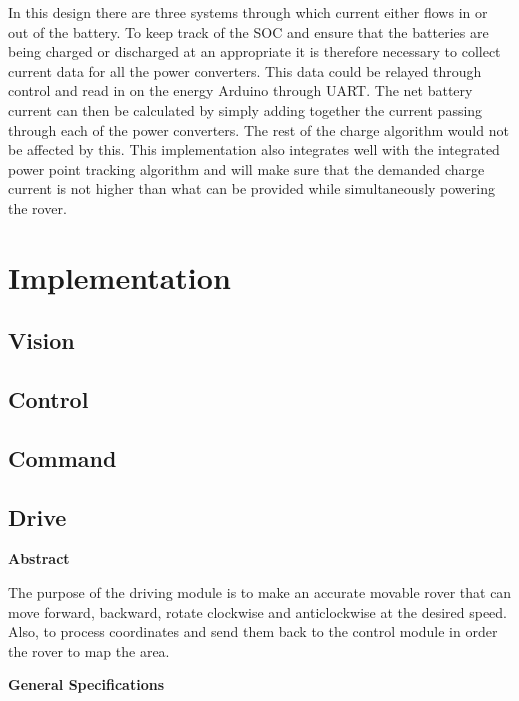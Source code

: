 \documentclass[a4paper]{article}
\begin{document}
In this design there are three systems through which current either flows in or 
out of the battery. To keep track of the SOC and ensure that the batteries are 
being charged or discharged at an appropriate it is therefore necessary to collect
current data for all the power converters. This data could be relayed through control 
and read in on the energy Arduino through UART. The net battery current can then be 
calculated by simply adding together the current passing through each of the power 
converters. The rest of the charge algorithm would not be affected by this. This 
implementation also integrates well with the integrated power point tracking algorithm 
and will make sure that the demanded charge current is not higher than what can be 
provided while simultaneously powering the rover.



\section{Implementation}

\subsection{Vision}

\subsection{Control}

\subsection{Command}

\subsection{Drive}

\begin{center}
\textbf{Abstract}
\end{center}
The purpose of the driving module is to make an accurate movable rover that can 
move forward, backward, rotate clockwise and anticlockwise at the desired speed.
Also, to process coordinates and send them back to the control module in order 
the rover to map the area.

\textbf{General Specifications}
\end{document}
